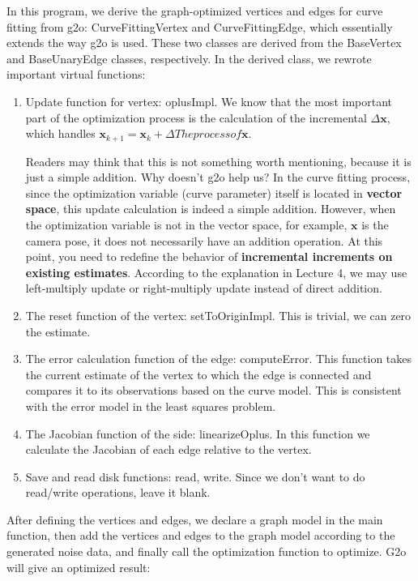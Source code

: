 In this program, we derive the graph-optimized vertices and edges for curve fitting from g2o: CurveFittingVertex and CurveFittingEdge, which essentially extends the way g2o is used. These two classes are derived from the BaseVertex and BaseUnaryEdge classes, respectively. In the derived class, we rewrote important virtual functions:

\begin{enumerate}
  \item Update function for vertex: oplusImpl. We know that the most important part of the optimization process is the calculation of the incremental $\Delta \bm{x}$, which handles $\bm{x}_{k+1} = \bm{x}_k + \Delta The process of \bm{x}$.

  Readers may think that this is not something worth mentioning, because it is just a simple addition. Why doesn't g2o help us? In the curve fitting process, since the optimization variable (curve parameter) itself is located in \textbf{vector space}, this update calculation is indeed a simple addition. However, when the optimization variable is not in the vector space, for example, $\bm{x}$ is the camera pose, it does not necessarily have an addition operation. At this point, you need to redefine the behavior of \textbf{incremental increments on existing estimates}. According to the explanation in Lecture 4, we may use left-multiply update or right-multiply update instead of direct addition.

  \item The reset function of the  vertex: setToOriginImpl. This is trivial, we can zero the estimate.

  \item The error calculation function of the edge: computeError. This function takes the current estimate of the vertex to which the edge is connected and compares it to its observations based on the curve model. This is consistent with the error model in the least squares problem.

  \item The Jacobian function of the side: linearizeOplus. In this function we calculate the Jacobian of each edge relative to the vertex.

  \item Save and read disk functions: read, write. Since we don't want to do read/write operations, leave it blank.
\end{enumerate}

After defining the vertices and edges, we declare a graph model in the main function, then add the vertices and edges to the graph model according to the generated noise data, and finally call the optimization function to optimize. G2o will give an optimized result:

